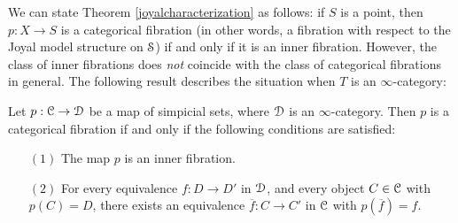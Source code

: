 We can state Theorem \ref{joyalcharacterization} as follows: if $S$ is a point, then
$p: X \rightarrow S$ is a categorical fibration (in other words, a fibration with respect to the Joyal model structure on $\operatorname{\mathcal{S}}$) if and only if it is an inner fibration. However, the class of inner fibrations does {\em not} coincide with the class of categorical fibrations in general. The following result describes the situation when $T$ is an $\infty$-category:

\begin{corollary}[Joyal]\label{gottaput}
Let $p: \operatorname{\mathcal{C}} \rightarrow \operatorname{\mathcal{D}}$ be a map of simpicial sets, where $\operatorname{\mathcal{D}}$ is an $\infty$-category.
Then $p$ is a categorical fibration if and only if the following conditions are satisfied:
\begin{itemize}
\item[$(1)$] The map $p$ is an inner fibration.
\item[$(2)$] For every equivalence $f: D \rightarrow D'$ in $\operatorname{\mathcal{D}}$, and every
object $C \in \operatorname{\mathcal{C}}$ with $p(C) = D$, there exists an equivalence
$\overline{f}: C \rightarrow C'$ in $\operatorname{\mathcal{C}}$ with $p( \overline{f}) = f$.
\end{itemize}
\end{corollary}


